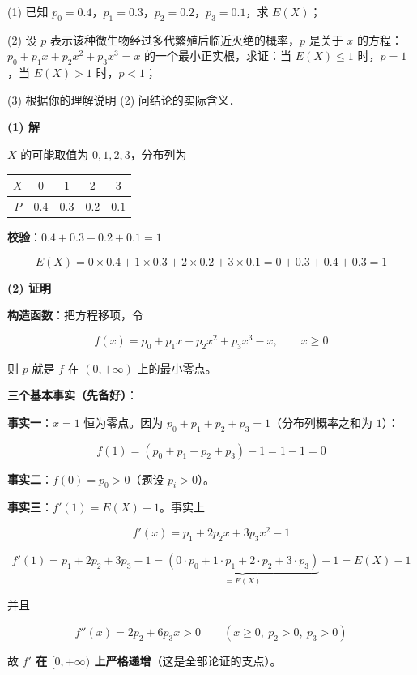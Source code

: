   (1) 已知 $p_0=0.4$，$p_1=0.3$，$p_2=0.2$，$p_3=0.1$，求 $E(X)$；

  (2) 设 $p$ 表示该种微生物经过多代繁殖后临近灭绝的概率，$p$ 是关于 $x$ 的方程：$p_0+p_1x+p_2x^{2}+p_3x^{3}=x$ 的一个最小正实根，求证：当 $E(X)\le1$ 时，$p=1$，当 $E(X)>1$ 时，$p<1$；

  (3) 根据你的理解说明 (2) 问结论的实际含义．

\par\medskip

\textbf{(1) 解}

$X$ 的可能取值为 $0,1,2,3$，分布列为

\begin{center}
\begin{tabular}{ccccc}
\toprule
$X$ & $0$ & $1$ & $2$ & $3$ \\
\midrule
$P$ & $0.4$ & $0.3$ & $0.2$ & $0.1$ \\
\bottomrule
\end{tabular}
\end{center}

\textbf{校验}：$0.4+0.3+0.2+0.1=1$ 

\[E(X)=0\times0.4+1\times0.3+2\times0.2+3\times0.1=0+0.3+0.4+0.3=1\]


\par\medskip

\textbf{(2) 证明}

\textbf{构造函数}：把方程移项，令

\[f(x)=p_0+p_1x+p_2x^{2}+p_3x^{3}-x,\qquad x\ge0\]

则 $p$ 就是 $f$ 在 $(0,+\infty)$ 上的最小零点。

\textbf{三个基本事实（先备好）}：

\textbf{事实一}：$x=1$ 恒为零点。因为 $p_0+p_1+p_2+p_3=1$（分布列概率之和为 $1$）：

\[f(1)=\left(p_0+p_1+p_2+p_3\right)-1=1-1=0\]

\textbf{事实二}：$f(0)=p_0>0$（题设 $p_i>0$）。

\textbf{事实三}：$f'(1)=E(X)-1$。事实上

\[f'(x)=p_1+2p_2x+3p_3x^{2}-1\]

\[f'(1)=p_1+2p_2+3p_3-1=\underbrace{\left(0\cdot p_0+1\cdot p_1+2\cdot p_2+3\cdot p_3\right)}_{=E(X)}-1=E(X)-1\]

并且

\[f''(x)=2p_2+6p_3x>0\qquad(x\ge0,\ p_2>0,\ p_3>0)\]

故 \textbf{$f'$ 在 $[0,+\infty)$ 上严格递增}（这是全部论证的支点）。

